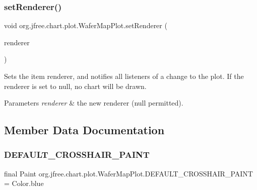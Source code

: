 \subsubsection{\texorpdfstring{set\+Renderer()}{setRenderer()}}
{\footnotesize\ttfamily void org.\+jfree.\+chart.\+plot.\+Wafer\+Map\+Plot.\+set\+Renderer (\begin{DoxyParamCaption}\item[{\mbox{\hyperlink{classorg_1_1jfree_1_1chart_1_1renderer_1_1_wafer_map_renderer}{Wafer\+Map\+Renderer}}}]{renderer }\end{DoxyParamCaption})}

Sets the item renderer, and notifies all listeners of a change to the plot. If the renderer is set to {\ttfamily null}, no chart will be drawn.


\begin{DoxyParams}{Parameters}
{\em renderer} & the new renderer ({\ttfamily null} permitted). \\
\hline
\end{DoxyParams}


\subsection{Member Data Documentation}
\mbox{\label{classorg_1_1jfree_1_1chart_1_1plot_1_1_wafer_map_plot_a7f548dffec89c74a7b9aa2ccc6884e91}} 
\subsubsection{\texorpdfstring{D\+E\+F\+A\+U\+L\+T\+\_\+\+C\+R\+O\+S\+S\+H\+A\+I\+R\+\_\+\+P\+A\+I\+NT}{DEFAULT\_CROSSHAIR\_PAINT}}
{\footnotesize\ttfamily final Paint org.\+jfree.\+chart.\+plot.\+Wafer\+Map\+Plot.\+D\+E\+F\+A\+U\+L\+T\+\_\+\+C\+R\+O\+S\+S\+H\+A\+I\+R\+\_\+\+P\+A\+I\+NT = Color.\+blue\hspace{0.3cm}{\ttfamily [static]}}

